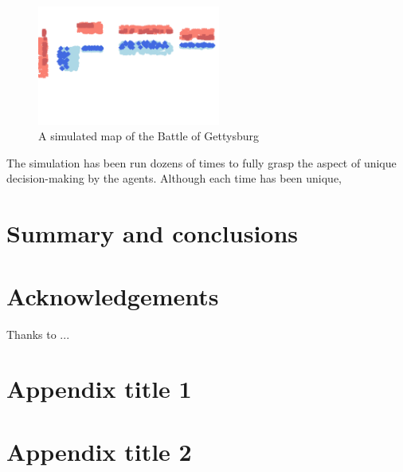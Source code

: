 \documentclass[final,5p,times,twocolumn,authoryear]{elsarticle}
\begin{document}
\begin{figure}[!ht]
  \centering
      \includegraphics[width=6cm]{sim_gett_map.png}
      \caption{A simulated map of the Battle of Gettysburg}
      \label{fig:Map}
  \centering
\end{figure}

The simulation has been run dozens of times to fully grasp the aspect of unique decision-making by the agents. Although each time has been unique,  

\section{Summary and conclusions}
\lipsum[1-4]


\section*{Acknowledgements}
Thanks to ...

\appendix

\section{Appendix title 1}

\section{Appendix title 2}

 







\end{document}
